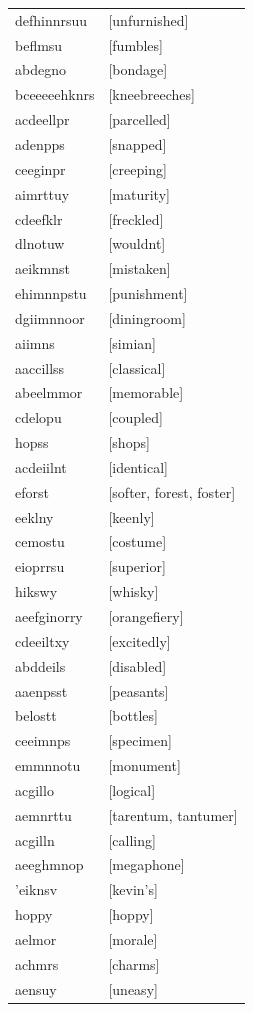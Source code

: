 \documentclass{article}
\begin{document}
\begin{tabular}{ll}
defhinnrsuu & [unfurnished] \\
beflmsu & [fumbles] \\
abdegno & [bondage] \\
bceeeeehknrs & [kneebreeches] \\
acdeellpr & [parcelled] \\
adenpps & [snapped] \\
ceeginpr & [creeping] \\
aimrttuy & [maturity] \\
cdeefklr & [freckled] \\
dlnotuw & [wouldnt] \\
aeikmnst & [mistaken] \\
ehimnnpstu & [punishment] \\
dgiimnnoor & [diningroom] \\
aiimns & [simian] \\
aaccillss & [classical] \\
abeelmmor & [memorable] \\
cdelopu & [coupled] \\
hopss & [shops] \\
acdeiilnt & [identical] \\
eforst & [softer, forest, foster] \\
eeklny & [keenly] \\
cemostu & [costume] \\
eioprrsu & [superior] \\
hikswy & [whisky] \\
aeefginorry & [orangefiery] \\
cdeeiltxy & [excitedly] \\
abddeils & [disabled] \\
aaenpsst & [peasants] \\
belostt & [bottles] \\
ceeimnps & [specimen] \\
emmnnotu & [monument] \\
acgillo & [logical] \\
aemnrttu & [tarentum, tantumer] \\
acgilln & [calling] \\
aeeghmnop & [megaphone] \\
'eiknsv & [kevin's] \\
hoppy & [hoppy] \\
aelmor & [morale] \\
achmrs & [charms] \\
aensuy & [uneasy] \\

\end{tabular}
\end{document}
